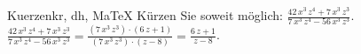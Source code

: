 \begin{MAufgabe}{Kuerzen}{kr, dh, MaTeX}
K\"urzen Sie soweit m\"oglich: $\frac{42\, x^3\, z^4 + 7\, x^3\, z^3}{7\, x^3\, z^4 - 56\, x^3\, z^3}$.\\ 
\ifLsg\MLoesung
\quad $\frac{42\, x^3\, z^4 + 7\, x^3\, z^3}{7\, x^3\, z^4 - 56\, x^3\, z^3}=\frac{(7\, x^3\, z^3)\cdot(6\, z + 1)}{(7\, x^3\, z^3)\cdot(z - 8)}=\frac{6\, z + 1}{z - 8}$.\else\relax\fi
 \end{MAufgabe}